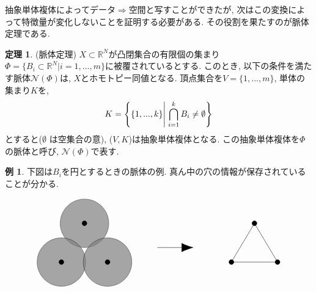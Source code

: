 \documentclass[a4paper]{jsarticle}
\theoremstyle{definition}
\newtheorem{thm}[dfn]{定理}
\newtheorem{exam}[dfn]{例}
\begin{document}
抽象単体複体によってデータ$\Rightarrow$空間と写すことができたが, 次はこの変換によって特徴量が変化しないことを証明する必要がある. その役割を果たすのが脈体定理である.
 
\begin{thm}
    (脈体定理) $X\subset \mathbb{R}^N$が凸閉集合の有限個の集まり$\Phi=\{B_i\subset \mathbb{R}^N| i=1,...,m\}$に被覆されているとする. このとき, 以下の条件を満たす脈体$\mathcal{N}(\Phi)$は, $X$とホモトピー同値となる. 頂点集合を$V=\{1,...,m\}$, 単体の集まり$K$を, 
\begin{equation}
   K = \left\{ \{1,...,k\} \middle| \; \bigcap_{i=1}^{k}B_{i} \neq \emptyset \right\} 
 \notag
 \end{equation}
とすると($\emptyset$ は空集合の意), ($V,K$)は抽象単体複体となる. この抽象単体複体を$\Phi$の脈体と呼び, $\mathcal{N}(\Phi)$で表す.
\end{thm}

\begin{exam}下図は$B_i$を円とするときの脈体の例. 真ん中の穴の情報が保存されていることが分かる.
\end{exam}
\begin{equation}
\begin{tikzpicture}
\filldraw[fill=gray, draw=black, opacity=0.7] (-4,0) circle (1);
\filldraw[fill=gray, draw=black, opacity=0.7] (-4.95,-1.6) circle (1);
\filldraw[fill=gray, draw=black, opacity=0.7] (-3.05,-1.6) circle (1);
\filldraw[fill=black, draw=black] (-4,0) circle (0.1);
\filldraw[fill=black, draw=black] (-4.95,-1.6) circle (0.1);
\filldraw[fill=black, draw=black] (-3.05,-1.6) circle (0.1);
\draw [-{Latex[length=5mm]}]  (-1,-1) -- (0.5,-1);
\filldraw[fill=black, draw=black] (3,0) circle (0.1);
\filldraw[fill=black, draw=black] (3.95,-1.6) circle (0.1);
\filldraw[fill=black, draw=black] (2.05,-1.6) circle (0.1);
\draw (3.95, -1.6) -- (2.05, -1.6);
\draw (3.95, -1.6) -- (3, 0);
\draw (3, 0) -- (2.05, -1.6);
\end{tikzpicture}
\notag    
\end{equation}
\end{document}
